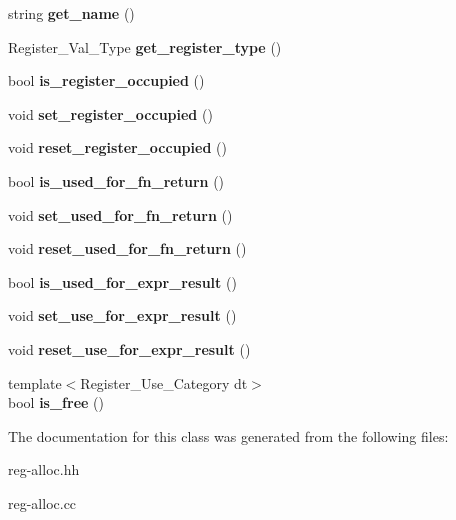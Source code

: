 \begin{DoxyCompactItemize}
string {\bfseries get\+\_\+name} ()
\item 
\mbox{\label{classRegister__Descriptor_a54997357bf8f247eeb658a01233e78e3}} 
Register\+\_\+\+Val\+\_\+\+Type {\bfseries get\+\_\+register\+\_\+type} ()
\item 
\mbox{\label{classRegister__Descriptor_ae3d5292f7f3967ca46df5ab410f832e4}} 
bool {\bfseries is\+\_\+register\+\_\+occupied} ()
\item 
\mbox{\label{classRegister__Descriptor_a9ff043de26a94f43f7e918c98353ee05}} 
void {\bfseries set\+\_\+register\+\_\+occupied} ()
\item 
\mbox{\label{classRegister__Descriptor_a5157f9bf84d0bac66fd27b9acf787f90}} 
void {\bfseries reset\+\_\+register\+\_\+occupied} ()
\item 
\mbox{\label{classRegister__Descriptor_a7488a3ce939e1f98fe7ee26ceef1fef2}} 
bool {\bfseries is\+\_\+used\+\_\+for\+\_\+fn\+\_\+return} ()
\item 
\mbox{\label{classRegister__Descriptor_a030595292125f854b9182f360329773e}} 
void {\bfseries set\+\_\+used\+\_\+for\+\_\+fn\+\_\+return} ()
\item 
\mbox{\label{classRegister__Descriptor_a43a472069861c4a32c550b612401446c}} 
void {\bfseries reset\+\_\+used\+\_\+for\+\_\+fn\+\_\+return} ()
\item 
\mbox{\label{classRegister__Descriptor_a41facbf33871f0c660e2d4db7bc34720}} 
bool {\bfseries is\+\_\+used\+\_\+for\+\_\+expr\+\_\+result} ()
\item 
\mbox{\label{classRegister__Descriptor_a0ad91317772df4d41de2748905f3e4b2}} 
void {\bfseries set\+\_\+use\+\_\+for\+\_\+expr\+\_\+result} ()
\item 
\mbox{\label{classRegister__Descriptor_a684b04a3a0ea668d4a1186713007b4ed}} 
void {\bfseries reset\+\_\+use\+\_\+for\+\_\+expr\+\_\+result} ()
\item 
\mbox{\label{classRegister__Descriptor_a97126ce0add3175c828489c6f3539849}} 
{\footnotesize template$<$Register\+\_\+\+Use\+\_\+\+Category dt$>$ }\\bool {\bfseries is\+\_\+free} ()
\end{DoxyCompactItemize}


The documentation for this class was generated from the following files\+:\begin{DoxyCompactItemize}
\item 
reg-\/alloc.\+hh\item 
reg-\/alloc.\+cc\end{DoxyCompactItemize}
